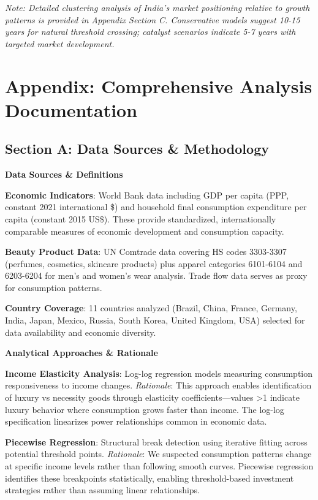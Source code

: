 \documentclass[11pt]{article}
\begin{document}
\textit{Note: Detailed clustering analysis of India's market positioning relative to growth patterns is provided in Appendix Section C. Conservative models suggest 10-15 years for natural threshold crossing; catalyst scenarios indicate 5-7 years with targeted market development.}

\newpage

\section*{Appendix: Comprehensive Analysis Documentation}

\subsection*{Section A: Data Sources \& Methodology}

\textbf{Data Sources \& Definitions}

\textbf{Economic Indicators}: World Bank data including GDP per capita (PPP, constant 2021 international \$) and household final consumption expenditure per capita (constant 2015 US\$). These provide standardized, internationally comparable measures of economic development and consumption capacity.

\textbf{Beauty Product Data}: UN Comtrade data covering HS codes 3303-3307 (perfumes, cosmetics, skincare products) plus apparel categories 6101-6104 and 6203-6204 for men's and women's wear analysis. Trade flow data serves as proxy for consumption patterns.

\textbf{Country Coverage}: 11 countries analyzed (Brazil, China, France, Germany, India, Japan, Mexico, Russia, South Korea, United Kingdom, USA) selected for data availability and economic diversity.

\textbf{Analytical Approaches \& Rationale}

\textbf{Income Elasticity Analysis}: Log-log regression models measuring consumption responsiveness to income changes. \textit{Rationale}: This approach enables identification of luxury vs necessity goods through elasticity coefficients—values >1 indicate luxury behavior where consumption grows faster than income. The log-log specification linearizes power relationships common in economic data.

\textbf{Piecewise Regression}: Structural break detection using iterative fitting across potential threshold points. \textit{Rationale}: We suspected consumption patterns change at specific income levels rather than following smooth curves. Piecewise regression identifies these breakpoints statistically, enabling threshold-based investment strategies rather than assuming linear relationships.
\end{document}
